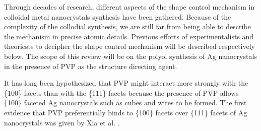 
Through decades of research, different aspects of the shape control mechanism in colloidal metal nanocrystals synthesis have been gathered.
Because of the complexity of the collodial synthesis, we are still far from being able to describe the mechanism in precise atomic details.
Previous efforts of experimentalists and theoriests to decipher the shape control mechanism will be described respectively below.
The scope of this review will be on the polyol synthesis of Ag nanocrystals in the presence of PVP as the structure directing agent.

It has long been hypothesized that PVP might interact more strongly with the \{100\} facets than with the \{111\} facets because the presence of PVP allows \{100\} faceted Ag nanocrystals such as cubes \cite{Sun_2002b} and wires \cite{Sun_2002} to be formed.
The first evidence that PVP preferentially binds to \{100\} facets over \{111\} facets of Ag nanocrystals was given by Xia et al. \cite{Sun_2003}.

  
